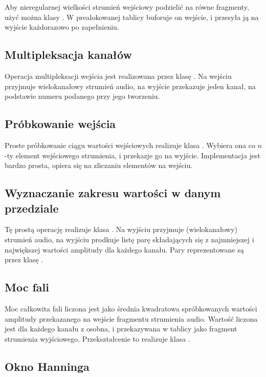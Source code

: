 Aby nieregularnej wielkości strumień wejściowy podzielić na równe fragmenty, użyć można klasy
. W prealokowanej tablicy buforuje on wejście, i przesyła ją na wyjście każdorazowo
po zapełnieniu.


\subsection{Multipleksacja kanałów}

Operacja multipleksacji wejścia jest realizowana przez klasę . Na wejściu
przyjmuje wielokanałowy strumień audio, na wyjście przekazuje jeden kanał, na podstawie numeru
podanego przy jego tworzeniu.


\subsection{Próbkowanie wejścia}

Proste próbkowanie ciągu wartości wejściowych realizuje klasa . Wybiera ona co $n$-ty
element wejściowego strumienia, i przekazje go na wyjście. Implementacja jest bardzo prosta, opiera
się na zliczaniu elementów na wejściu.


\subsection{Wyznaczanie zakresu wartości w danym przedziale}

Tę prostą operację realizuje klasa . Na wyjściu przyjmuje (wielokanałowy)
strumień audio, na wyjściu prodkuje listę parę składających się z najmniejszej i największej
wartości amplitudy dla każdego kanału. Pary reprezentowane są przez klasę .


\subsection{Moc fali}

Moc całkowita fali liczona jest jako średnia kwadratowa spróbkowanych wartości amplitudy
przekazanego na wejście fragmentu strumienia audio. Wartość liczona jest dla każdego kanału z
osobna, i przekazywana w tablicy jako fragment strumienia wyjściowego. Przekształcenie to realizuje
klasa .


\subsection{Okno Hanninga}

